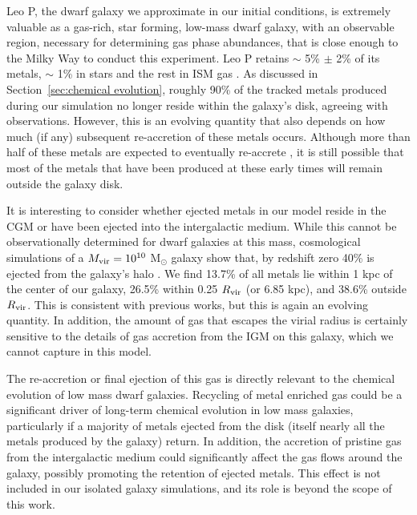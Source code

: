 \documentclass[twocolumn]{aastex61}
\begin{document}
Leo P, the dwarf galaxy we approximate in our initial conditions, is extremely valuable as a gas-rich,
star forming, low-mass dwarf galaxy, with an observable  region, necessary for determining gas phase abundances, that is close enough to the Milky Way to conduct this experiment. Leo P retains $\sim$ 5\% $\pm$ 2\% of its metals, $\sim$ 1\% in stars and the rest in ISM gas \citep{McQuinn2015}. As discussed in Section~\ref{sec:chemical evolution}, roughly 90\% of the tracked metals produced during our simulation no longer reside within the galaxy's disk, agreeing with observations. However, this is an evolving quantity that also depends on how much (if any) subsequent re-accretion of these metals occurs. Although more than half of these metals are expected to eventually re-accrete \citep{Angles-Alcazar2017}, it is still possible that most of the metals that have been produced at these early times will remain outside the galaxy disk.

It is interesting to consider whether ejected metals in our model reside in the CGM or have been ejected into the intergalactic medium. While this cannot be observationally determined for dwarf galaxies at this mass, cosmological simulations of a $M_{\rm vir} = 10^{10}$ M$_{\odot}$ galaxy show that, by redshift zero 40\% is ejected from the galaxy's halo \citep{Angles-Alcazar2017}. We find 13.7\% of all metals lie within 1 kpc of the center of our galaxy, 26.5\% within 0.25 $R_{\rm vir}$ (or 6.85 kpc), and 38.6\% outside $R_{\rm vir}$. This is consistent with previous works, but this is again an evolving quantity. In addition, the amount of gas that escapes the virial radius is certainly sensitive to the details of gas accretion from the IGM on this galaxy, which we cannot capture in this model.

The re-accretion or final ejection of this gas is directly relevant to the chemical evolution of low mass dwarf galaxies. Recycling of metal enriched gas could be a significant driver of long-term chemical evolution in low mass galaxies, particularly if a majority of metals ejected from the disk (itself nearly all the metals produced by the galaxy) return. In addition, the accretion of pristine gas from the intergalactic medium could significantly affect the gas flows around the galaxy, possibly promoting the retention of ejected metals. This effect is not included in our isolated galaxy simulations, and its role is beyond the scope of this work.
\end{document}
